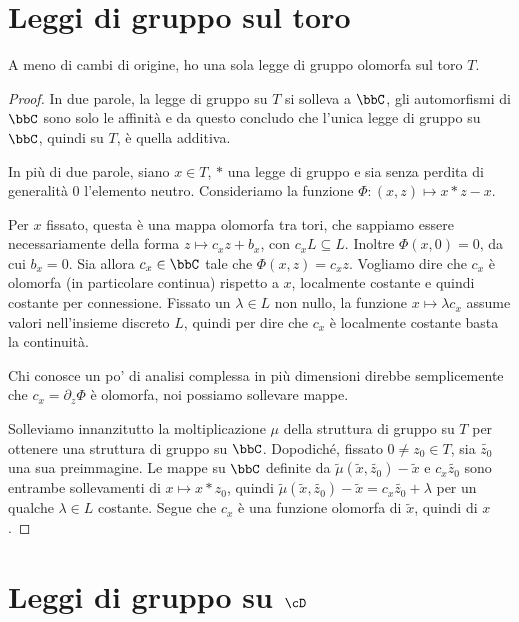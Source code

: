 \section{Leggi di gruppo sul toro}

\begin{proposizione}
A meno di cambi di origine, ho una sola legge di gruppo olomorfa sul toro $T$.
\end{proposizione}

\begin{proof}
	In due parole, la legge di gruppo su $T$ si solleva a $\bbC$, gli automorfismi
	di $\bbC$ sono solo le affinità e da questo concludo che l'unica legge di gruppo su
	$\bbC$, quindi su $T$, è quella additiva.

	In più di due parole, siano $x \in T$, $*$ una legge di gruppo e sia senza perdita di
	generalità $0$ l'elemento neutro. Consideriamo la funzione $\Phi: (x, z) \mapsto x * z - x$.

	Per $x$ fissato, questa è una mappa olomorfa tra tori, che sappiamo essere necessariamente
	della forma $z \mapsto c_x z + b_x$, con $c_x L \subseteq L$. Inoltre $\Phi(x, 0) = 0$, da
	cui $b_x = 0$. Sia allora $c_x \in \bbC$ tale che $\Phi(x, z) = c_x z$.
	Vogliamo dire che $c_x$ è olomorfa (in particolare continua) rispetto a $x$, localmente costante
	e quindi costante per connessione.
	Fissato un $\lambda \in L$ non nullo, la funzione $x \mapsto \lambda c_x$ assume valori
	nell'insieme discreto $L$, quindi per dire che $c_x$ è localmente costante basta la continuità.
	
	Chi conosce un po' di analisi complessa in più dimensioni direbbe semplicemente che
	$c_x = \partial_z \Phi$ è olomorfa, noi possiamo sollevare mappe.

	Solleviamo innanzitutto la moltiplicazione $\mu$ della struttura di gruppo su $T$ per ottenere una
	struttura di gruppo su $\bbC$. Dopodiché, fissato $0 \ne z_0 \in T$, sia $\tilde{z_0}$ una sua preimmagine.
	Le mappe su $\bbC$ definite da $\tilde{\mu}(\tilde{x}, \tilde{z_0}) - \tilde{x}$ e $c_x \tilde{z_0}$ sono
	entrambe sollevamenti di $x \mapsto x * z_0$, quindi $\tilde{\mu}(\tilde{x}, \tilde{z_0}) - \tilde{x} = c_x \tilde{z_0} + \lambda$
	per un qualche $\lambda \in L$ costante.
	Segue che $c_x$ è una funzione olomorfa di $\tilde{x}$, quindi di $x$.
\end{proof}

\section{Leggi di gruppo su $\cD$}

